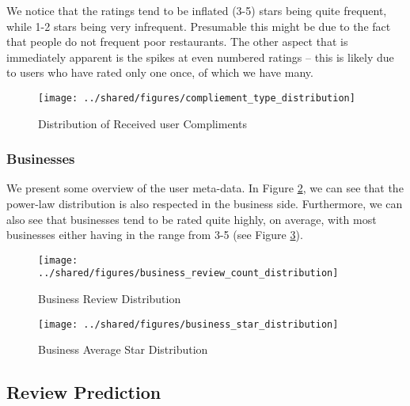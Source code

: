\documentclass[letterpaper, 10 pt, conference]{ieeeconf}  %
\begin{document}
We notice that the ratings tend to be inflated (3-5) stars being quite frequent, while 1-2 stars being very infrequent. Presumable this might be due to the fact that people do not frequent poor restaurants. The other aspect that is immediately apparent is the spikes at even numbered ratings -- this is likely due to users who have rated only one once, of which we have many.

\begin{figure}[h!]
\centering
\texttt{[image: ../shared/figures/compliement\_type\_distribution]}
\caption{Distribution of Received user Compliments}
\label{fig:user_compliment_distribution}
\end{figure}

\subsubsection{Businesses}
We present some overview of the user meta-data. In Figure \ref{fig:business_review_distribution}, we can see that the power-law distribution is also respected in the business side. Furthermore, we can also see that businesses tend to be rated quite highly, on average, with most businesses either having in the range from 3-5 (see Figure \ref{fig:business_star_distribution}).

\begin{figure}[h!]
\centering
\texttt{[image: ../shared/figures/business\_review\_count\_distribution]}
\caption{Business Review Distribution}
\label{fig:business_review_distribution}
\end{figure}

\begin{figure}[h!]
\centering
\texttt{[image: ../shared/figures/business\_star\_distribution]}
\caption{Business Average Star Distribution}
\label{fig:business_star_distribution}
\end{figure}

\subsection{Review Prediction}
\end{document}
